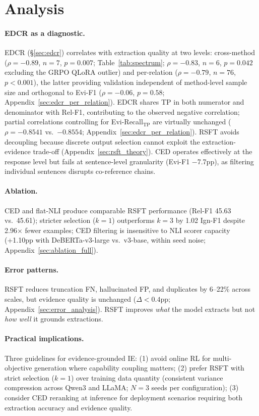 \section{Analysis}
\label{sec:analysis}

\paragraph{EDCR as a diagnostic.}
EDCR (\S\ref{sec:edcr}) correlates with extraction quality at two levels: cross-method ($\rho = -0.89$, $n = 7$, $p = 0.007$; Table~\ref{tab:spectrum}; $\rho = -0.83$, $n = 6$, $p = 0.042$ excluding the GRPO QLoRA outlier) and per-relation ($\rho = -0.79$, $n = 76$, $p < 0.001$), the latter providing validation independent of method-level sample size and orthogonal to Evi-F1 ($\rho = -0.06$, $p = 0.58$; Appendix~\ref{sec:edcr_per_relation}). EDCR shares TP in both numerator and denominator with Rel-F1, contributing to the observed negative correlation; partial correlations controlling for Evi-Recall$_\text{TP}$ are virtually unchanged ($\rho = -0.8541$ vs.\ $-0.8554$; Appendix~\ref{sec:edcr_per_relation}). RSFT avoids decoupling because discrete output selection cannot exploit the extraction-evidence trade-off (Appendix~\ref{sec:rsft_theory}). CED operates effectively at the response level but fails at sentence-level granularity (Evi-F1 $-$7.7pp), as filtering individual sentences disrupts co-reference chains.

\paragraph{Ablation.}
CED and flat-NLI produce comparable RSFT performance (Rel-F1 45.63 vs.\ 45.61); stricter selection ($k{=}1$) outperforms $k{=}3$ by 1.02 Ign-F1 despite 2.96$\times$ fewer examples; CED filtering is insensitive to NLI scorer capacity (+1.10pp with DeBERTa-v3-large vs.\ v3-base, within seed noise; Appendix~\ref{sec:ablation_full}).

\paragraph{Error patterns.}
RSFT reduces truncation FN, hallucinated FP, and duplicates by 6--22\% across scales, but evidence quality is unchanged ($\Delta < 0.4$pp; Appendix~\ref{sec:error_analysis}). RSFT improves \emph{what} the model extracts but not \emph{how well} it grounds extractions.

\paragraph{Practical implications.}
Three guidelines for evidence-grounded IE: (1) avoid online RL for multi-objective generation where capability coupling matters; (2) prefer RSFT with strict selection ($k{=}1$) over training data quantity (consistent variance compression across Qwen3 and LLaMA; $N{=}3$ seeds per configuration); (3) consider CED reranking at inference for deployment scenarios requiring both extraction accuracy and evidence quality.
